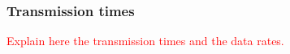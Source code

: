 \documentclass[a4paper]{article}
\begin{document}
	\subsubsection{Transmission times}
	\textcolor{red}{Explain here the transmission times and the data rates.}
	
%	
\end{document}

